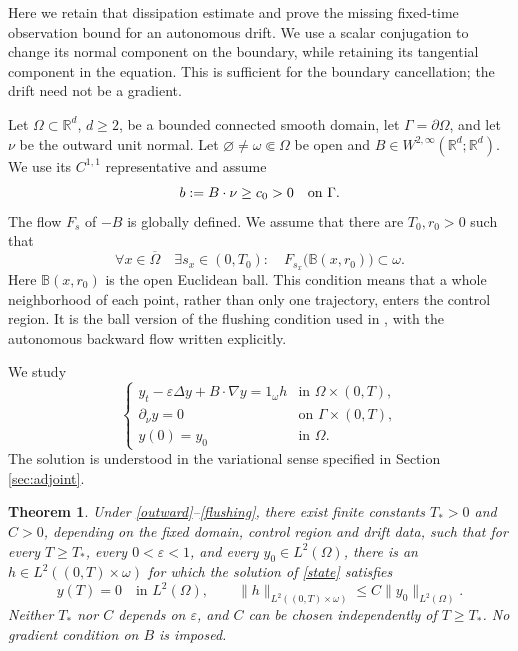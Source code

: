 \documentclass[11pt]{article}
\newtheorem{theorem}{Theorem}[section]
\theoremstyle{remark}
\newcommand{\eps}{\varepsilon}
\newcommand{\R}{\mathbb R}
\begin{document}
Here we retain that dissipation estimate and prove the missing fixed-time
observation bound for an autonomous drift. We use a scalar conjugation to
change its normal component on the boundary, while retaining its tangential
component in the equation. This is sufficient for the boundary cancellation;
the drift need not be a gradient.

Let $\Omega\subset\R^d$, $d\ge2$, be a bounded connected smooth domain, let
$\Gamma=\partial\Omega$, and let $\nu$ be the outward unit normal. Let
$\varnothing\ne\omega\Subset\Omega$ be open and
$B\in W^{2,\infty}(\R^d;\R^d)$. We use its $C^{1,1}$ representative and assume
\begin{equation}\label{outward}
 b:=B\cdot\nu\ge c_0>0\quad\hbox{on }\Gamma.
\end{equation}
The flow $F_s$ of $-B$ is globally defined. We assume that there are
$T_0,r_0>0$ such that
\begin{equation}\label{flushing}
 \forall x\in\overline\Omega\quad\exists s_x\in(0,T_0):
 \quad F_{s_x}\bigl(\mathbb B(x,r_0)\bigr)\subset\omega.
\end{equation}
Here $\mathbb B(x,r_0)$ is the open Euclidean ball. This condition means that a
whole neighborhood of each point, rather than only one trajectory, enters
the control region. It is the ball version of the flushing condition used in
\cite{Outward}, with the autonomous backward flow written explicitly.

We study
\begin{equation}\label{state}
 \begin{cases}
 y_t-\eps\Delta y+B\cdot\nabla y=1_\omega h
                  &\text{in }\Omega\times(0,T),\\
 \partial_\nu y=0  &\text{on }\Gamma\times(0,T),\\
 y(0)=y_0         &\text{in }\Omega.
 \end{cases}
\end{equation}
The solution is understood in the variational sense specified in Section
\ref{sec:adjoint}.

\begin{theorem}\label{main}
Under \eqref{outward}--\eqref{flushing}, there exist finite constants
$T_*>0$ and $C>0$, depending on the fixed domain, control region and drift
data, such that for every $T\ge T_*$, every $0<\eps<1$, and every
$y_0\in L^2(\Omega)$, there is an $h\in L^2((0,T)\times\omega)$ for which the
solution of \eqref{state} satisfies
\[
 y(T)=0\quad\text{in }L^2(\Omega),\qquad
 \|h\|_{L^2((0,T)\times\omega)}\le C\|y_0\|_{L^2(\Omega)}.
\]
Neither $T_*$ nor $C$ depends on $\eps$, and $C$ can be chosen independently
of $T\ge T_*$. No gradient condition on $B$ is imposed.
\end{theorem}
\end{document}
